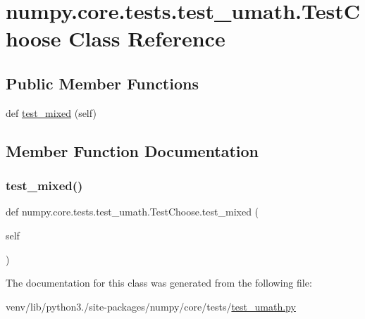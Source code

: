 \hypertarget{classnumpy_1_1core_1_1tests_1_1test__umath_1_1TestChoose}{}\section{numpy.\+core.\+tests.\+test\+\_\+umath.\+Test\+Choose Class Reference}
\label{classnumpy_1_1core_1_1tests_1_1test__umath_1_1TestChoose}
\subsection*{Public Member Functions}
\begin{DoxyCompactItemize}
\item 
def \hyperlink{classnumpy_1_1core_1_1tests_1_1test__umath_1_1TestChoose_a21a99fbdca4fda243a66b50b2b5e5563}{test\+\_\+mixed} (self)
\end{DoxyCompactItemize}


\subsection{Member Function Documentation}
\mbox{\label{classnumpy_1_1core_1_1tests_1_1test__umath_1_1TestChoose_a21a99fbdca4fda243a66b50b2b5e5563}} 
\subsubsection{\texorpdfstring{test\+\_\+mixed()}{test\_mixed()}}
{\footnotesize\ttfamily def numpy.\+core.\+tests.\+test\+\_\+umath.\+Test\+Choose.\+test\+\_\+mixed (\begin{DoxyParamCaption}\item[{}]{self }\end{DoxyParamCaption})}



The documentation for this class was generated from the following file\+:\begin{DoxyCompactItemize}
\item 
venv/lib/python3./site-\/packages/numpy/core/tests/\hyperlink{test__umath_8py}{test\+\_\+umath.\+py}\end{DoxyCompactItemize}
